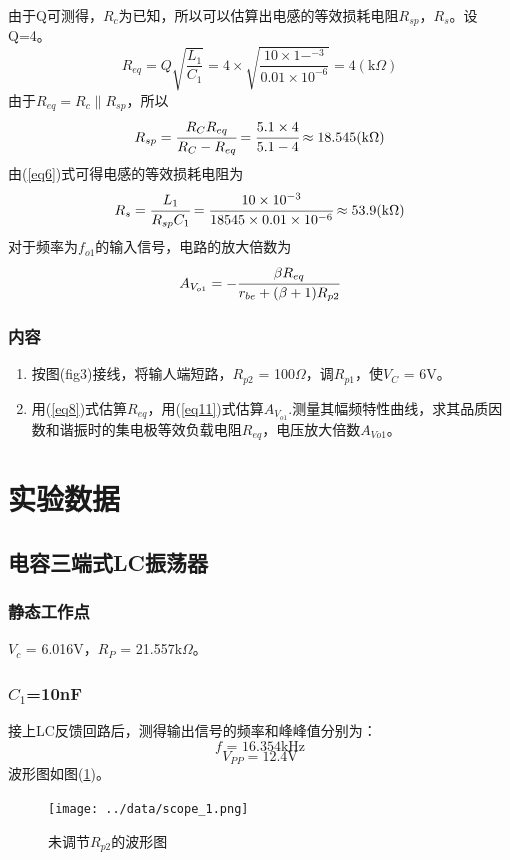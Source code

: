 \documentclass[a4paper]{article}
\begin{document}
由于Q可测得，$R_c$为已知，所以可以估算出电感的等效损耗电阻$R_{sp}$，$R_s$。设Q=4。
\begin{equation}
R_{eq} = Q\sqrt{\frac{L_1}{C_1}} = 4\times \sqrt{\frac{10\times 1-^{-3}}{0.01\times 10^{-6}}} = 4 (\text{k}\Omega)\label{eq8}
\end{equation}
由于$R_{eq} = R_c\parallel R_{sp}$，所以
\begin{equation}
R_{sp} = \cfrac{R_CR_{eq}}{R_C - R_{eq}} = \cfrac{5.1\times 4}{5.1 - 4} \approx 18.545 (\text{k}\Omega)\label{eq9}
\end{equation}
由(\ref{eq6})式可得电感的等效损耗电阻为
\begin{equation}
R_s = \cfrac{L_1}{R_{sp}C_1} = \cfrac{10\times 10^{-3}}{18545\times 0.01\times 10^{-6}} \approx 53.9 (\text{k}\Omega)\label{eq10}
\end{equation}
对于频率为$f_{o1}$的输入信号，电路的放大倍数为
\begin{eqnarray}
A_{V_{o1}} = -\cfrac{\beta R_{eq}}{r_{be}+(\beta +1)R_{p2}}\label{eq11}
\end{eqnarray}
\subsubsection{内容}
\begin{enumerate}
\item 按图(fig3)接线，将输人端短路，$R_{p2}$ = 100$\Omega$，调$R_{p1}$，使$V_C$ = 6V。
\item 用(\ref{eq8})式估箅$R_{eq}$，用(\ref{eq11})式估算$A_{V_{o1}}$.测量其幅频特性曲线，求其品质因数和谐振时的集电极等效负载电阻$R_{eq}$，电压放大倍数$A_{V{o1}}$。
\end{enumerate}

\section{实验数据}
\subsection{电容三端式LC振荡器}
\subsubsection{静态工作点}
$V_c$ = 6.016V，$R_P$ = 21.557k$\Omega$。
\subsubsection{$C_1$=10nF}
接上LC反馈回路后，测得输出信号的频率和峰峰值分别为：
$$f\text{ = 16.354kHz}$$
$$V_{PP} = 12.4\text{V}$$
波形图如图(\ref{datafig1})。
\begin{figure}[!h]
\centering
\texttt{[image: ../data/scope\_1.png]}\\
\caption{未调节$R_{p2}$的波形图}\label{datafig1}
\end{figure}
\end{document}
